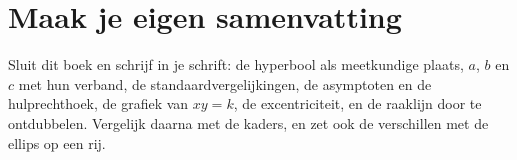 
\ifzelfstudie
\section*{Maak je eigen samenvatting}
Sluit dit boek en schrijf in je schrift: de hyperbool als meetkundige plaats, $a$, $b$ en $c$ met hun verband, de standaardvergelijkingen, de asymptoten en de hulprechthoek, de grafiek van $xy = k$, de excentriciteit, en de raaklijn door te ontdubbelen. Vergelijk daarna met de kaders, en zet ook de verschillen met de ellips op een rij.
\fi
